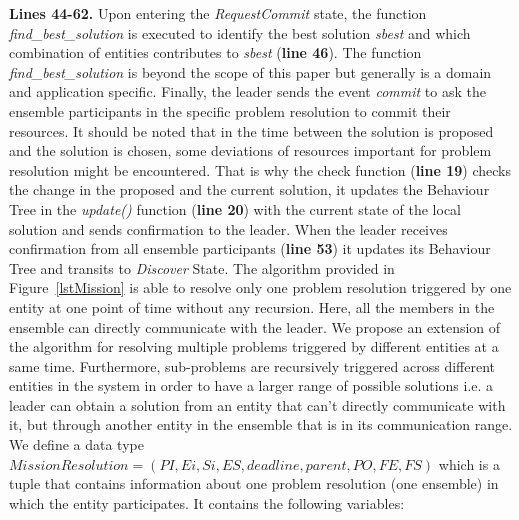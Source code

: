 \documentclass[journal]{IEEEtran}
\theoremstyle{definition}
\begin{document}
\textbf{Lines 44-62.}
Upon entering the \textit{RequestCommit} state, the function \textit{find\_best\_solution} is executed to identify the best solution \textit{sbest} and which combination of entities contributes to \textit{sbest} (\textbf{line 46}). The function \textit{find\_best\_solution} is beyond the scope of this paper but generally is a domain and application specific. Finally, the leader sends the event \textit{commit} to ask the ensemble participants in the specific problem resolution to commit their resources. 
It should be noted that in the time between the solution is proposed and the solution is chosen, some deviations of resources important for problem resolution might be encountered. That is why the check function (\textbf{line 19}) checks the change in the proposed and the current solution, it updates the Behaviour Tree in the \textit{update()} function (\textbf{line 20}) with the current state of the local solution and sends confirmation to the leader. When the leader receives confirmation from all ensemble participants (\textbf{line 53}) it updates its Behaviour Tree and transits to \textit{Discover} State. 
The algorithm provided in Figure~\ref{lstMission} is able to resolve only one problem resolution triggered by one entity at one point of time without any recursion. Here, all the members in the ensemble can directly communicate with the leader. We propose an extension of the algorithm for resolving multiple problems triggered by different entities at a same time. Furthermore, sub-problems are recursively triggered across different entities in the system in order to have a larger range of possible solutions i.e. a leader can obtain a solution from an entity that can't directly communicate with it, but through another entity in the ensemble that is in its communication range. We define a data type  $MissionResolution = (PI, Ei, Si, ES, deadline, parent, PO, FE, FS)$ which is a tuple that contains information about one problem resolution (one ensemble) in which the entity participates.
It contains the following variables:
\end{document}
